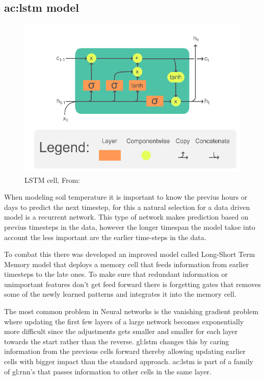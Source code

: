 \subsection{\acrfull{ac:lstm} model}\label{sec:theory:lstm}
\begin{figure}[ht]
	\centering
	\includegraphics[width=0.7\linewidth]{figures/LSTM_Cell}
	\caption{LSTM cell,  From: \textcite{chevalier_english_2018}}
	\label{fig:lstmcell}
\end{figure}
When modeling soil temperature it is important to know the previus hours or days to predict the next timestep, for this a natural selection for a data driven model is a recurrent network. This type of network makes prediction based on previus timesteps in the data, however the longer timespan the model takse into account the less important are the earlier time-steps in the data. 

To combat this there was developed an improved model called Long-Short Term Memory model\cite{hochreiter_long_1997} that deploys a memory cell that feeds information from earlier timesteps to the late ones. To make sure that redundant information or unimportant features don't get feed forward there is forgetting gates that removes some of the newly learned patterns and integrates it into the memory cell. 

The most common problem in Neural networks is the vanishing gradient problem where updating the first few layers of a large network becomes exponentially more difficult since the adjustments gets smaller and smaller for each layer towards the start rather than the reverse. \gls{gl:lstm} changes this by caring information from the previous cells forward thereby allowing updating earlier cells with bigger impact than the standard approach\cite{hochreiter_long_1997}. \acrshort{ac:lstm} is part of a family of \gls{gl:rnn}'s that passes information to other cells in the same layer.

